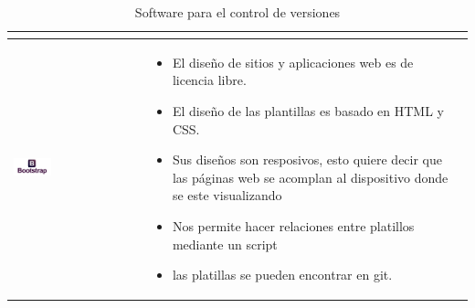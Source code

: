 \begin{table}[b!]
\begin{tabular}{|p{2cm}|ll}
{\begin{itemize}
      \end{itemize}} \\ 
       \hline
       \multicolumn{1}{|p{5cm}|}{\includegraphics[width=0.3\textwidth]{images/bootstrap}}& 
          \multicolumn{1}{p{10cm}|}{
          \begin{itemize}
          \vspace{-15mm}
          \item El diseño de sitios y aplicaciones web es de licencia libre.
        \item El diseño de las  plantillas es basado en HTML y CSS.
        \item Sus diseños son resposivos, esto quiere decir que las páginas web se acomplan al dispositivo donde se este visualizando  
        \item Nos permite hacer relaciones entre platillos mediante un script
		\item las platillas se pueden encontrar en git.
      \end{itemize}} \\
        \hline
      \end{tabular}
      \caption{Software para el control de versiones}
      \label{Cuadro Comparativo de software para la gestión y construcción de proyectos}
    \end{table}
        \newpage
